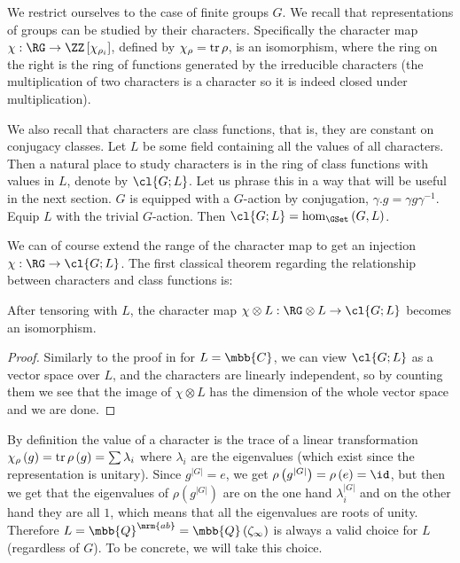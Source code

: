 We restrict ourselves to the case of finite groups $G$.
We recall that representations of groups can be studied by their characters.
Specifically the character map $\chi: \RG \to \ZZ\left[\chi_{\rho_i}\right]$, defined by $\chi_\rho = \operatorname{tr} \rho$, is an isomorphism, where the ring on the right is the ring of functions generated by the irreducible characters (the multiplication of two characters is a character so it is indeed closed under multiplication).

We also recall that characters are class functions, that is, they are constant on conjugacy classes.
Let $L$ be some field containing all the values of all characters.
Then a natural place to study characters is in the ring of class functions with values in $L$, denote by $\cl{G;L}$.
Let us phrase this in a way that will be useful in the next section.
$G$ is equipped with a $G$-action by conjugation, $\gamma.g = \gamma g \gamma^{-1}$.
Equip $L$ with the trivial $G$-action.
Then $\cl{G;L} = \hom_{\GSet}\left(G, L\right)$.

We can of course extend the range of the character map to get an injection $\chi: \RG \to \cl{G;L}$.
The first classical theorem regarding the relationship between characters and class functions is:

\begin{theorem}\label{char-1}
	After tensoring with $L$, the character map $\chi \otimes L: \RG \otimes L \to \cl{G; L}$ becomes an isomorphism.
\end{theorem}

\begin{proof}
	Similarly to the proof in \cite[9.1]{Ser} for $L = \mbb{C}$, we can view $\cl{G;L}$ as a vector space over $L$, and the characters are linearly independent, so by counting them we see that the image of $\chi \otimes L$ has the dimension of the whole vector space and we are done.
\end{proof}

By definition the value of a character is the trace of a linear transformation $\chi_\rho\left(g\right) = \operatorname{tr} \rho\left(g\right) = \sum \lambda_i$ where $\lambda_i$ are the eigenvalues (which exist since the representation is unitary).
Since $g^{\left|G\right|} = e$, we get $\rho\left(g^{\left|G\right|}\right) = \rho\left(e\right) = \id$, but then we get that the eigenvalues of $\rho\left(g^{\left|G\right|}\right)$ are on the one hand $\lambda_i^{\left|G\right|}$ and on the other hand they are all $1$, which means that all the eigenvalues are roots of unity.
Therefore $L = \mbb{Q}^\mrm{ab} = \mbb{Q}\left(\zeta_\infty\right)$ is always a valid choice for $L$ (regardless of $G$).
To be concrete, we will take this choice.

